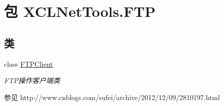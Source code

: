 \hypertarget{namespace_x_c_l_net_tools_1_1_f_t_p}{\section{包 X\-C\-L\-Net\-Tools.\-F\-T\-P}
\label{namespace_x_c_l_net_tools_1_1_f_t_p}
}
\subsection*{类}
\begin{DoxyCompactItemize}
\item 
class \hyperlink{class_x_c_l_net_tools_1_1_f_t_p_1_1_f_t_p_client}{F\-T\-P\-Client}
\begin{DoxyCompactList}\small\item\em F\-T\-P操作客户端类 \begin{DoxySeeAlso}{参见}
http\-://www.\-cnblogs.\-com/sufei/archive/2012/12/09/2810197.\-html


\end{DoxySeeAlso}
\end{DoxyCompactList}\end{DoxyCompactItemize}
